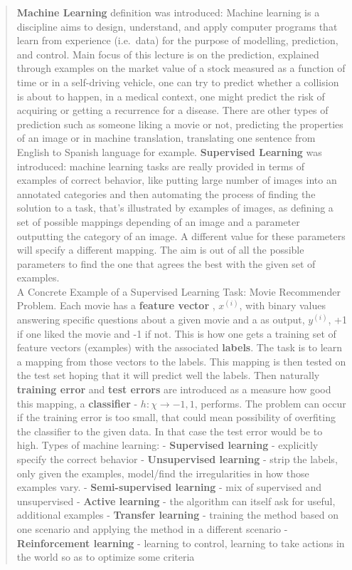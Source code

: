 \documentclass[]{article}
\begin{document}
\begin{quote}
\textbf{Machine Learning} definition was introduced: Machine learning is
a discipline aims to design, understand, and apply computer programs
that learn from experience (i.e.~data) for the purpose of modelling,
prediction, and control. Main focus of this lecture is on the
prediction, explained through examples on the market value of a stock
measured as a function of time or in a self-driving vehicle, one can try
to predict whether a collision is about to happen, in a medical context,
one might predict the risk of acquiring or getting a recurrence for a
disease. There are other types of prediction such as someone liking a
movie or not, predicting the properties of an image or in machine
translation, translating one sentence from English to Spanish language
for example. \textbf{Supervised Learning} was introduced: machine
learning tasks are really provided in terms of examples of correct
behavior, like putting large number of images into an annotated
categories and then automating the process of finding the solution to a
task, that's illustrated by examples of images, as defining a set of
possible mappings depending of an image and a parameter outputting the
category of an image. A different value for these parameters will
specify a different mapping. The aim is out of all the possible
parameters to find the one that agrees the best with the given set of
examples.\\
A Concrete Example of a Supervised Learning Task: Movie Recommender
Problem. Each movie has a \textbf{feature vector} , \(x^{(i)}\), with
binary values answering specific questions about a given movie and a as
output, \(y^{(i)}\), +1 if one liked the movie and -1 if not. This is
how one gets a training set of feature vectors (examples) with the
associated \textbf{labels}. The task is to learn a mapping from those
vectors to the labels. This mapping is then tested on the test set
hoping that it will predict well the labels. Then naturally
\textbf{training error} and \textbf{test errors} are introduced as a
measure how good this mapping, a \textbf{classifier} -
\(h: \chi \to {-1, 1}\), performs. The problem can occur if the training
error is too small, that could mean possibility of overfiting the
classifier to the given data. In that case the test error would be to
high. Types of machine learning: - \textbf{Supervised learning} -
explicitly specify the correct behavior - \textbf{Unsupervised learning}
- strip the labels, only given the examples, model/find the
irregularities in how those examples vary. - \textbf{Semi-supervised
learning} - mix of supervised and unsupervised - \textbf{Active
learning} - the algorithm can itself ask for useful, additional examples
- \textbf{Transfer learning} - training the method based on one scenario
and applying the method in a different scenario - \textbf{Reinforcement
learning} - learning to control, learning to take actions in the world
so as to optimize some criteria
\end{quote}
\end{document}
